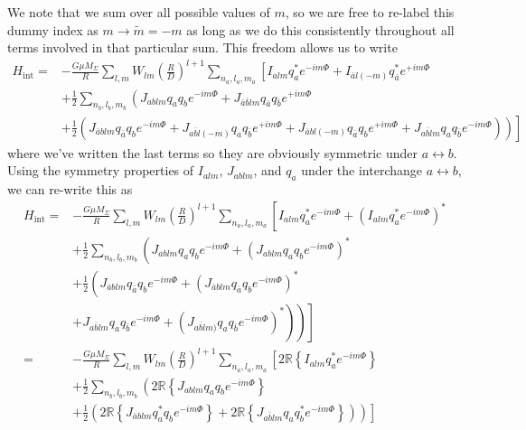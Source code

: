 We note that we sum over all possible values of $m$, so we are free to re-label this dummy index as $m\rightarrow\tilde{m}=-m$ as long as we do this consistently throughout all terms involved in that particular sum. This freedom allows us to write
\begin{subequations}
\begin{align}
H_{\mathrm{int}}  = & - \frac{G \mu M_{\Sigma}}{R} \sum_{l,m} W_{lm} \left(\frac{R}{D}\right)^{l+1} \sum_{n_a, l_a, m_a} \left[I_{alm}q_a^\ast e^{-i m \Phi} + I_{\bar{a}l(-m)}q_{\bar{a}}^\ast e^{+i m \Phi} \right. \\
                    & \left. + \frac{1}{2}\sum_{n_b,l_b,m_b} \left(J_{ablm}q_a q_b e^{-i m \Phi} + J_{\bar{a}\bar{b}lm}q_{\bar{a}}q_{\bar{b}} e^{+i m \Phi} \right. \right.\\
                    & \left. \left. + \frac{1}{2}\left( J_{\bar{a}blm}q_{\bar{a}} q_b e^{-i m \Phi} + J_{a\bar{b}l(-m)}q_a q_{\bar{b}} e^{+i m \Phi} + J_{\bar{a}bl(-m)}q_{\bar{a}} q_b e^{+i m \Phi} + J_{a\bar{b}lm}q_a q_{\bar{b}} e^{-i m \Phi} \right) \right) \right]
\end{align}
\end{subequations}
where we've written the last terms so they are obviously symmetric under $a \leftrightarrow b$. Using the symmetry properties of $I_{alm}$, $J_{ablm}$, and $q_{a}$ under the interchange $a\leftrightarrow b$, we can re-write this as
\begin{subequations}
\begin{align}
H_{\mathrm{int}}  = & - \frac{G \mu M_{\Sigma}}{R} \sum_{l,m} W_{lm} \left(\frac{R}{D}\right)^{l+1} \sum_{n_a, l_a, m_a} \left[I_{alm}q_a^\ast e^{-i m \Phi} + \left(I_{alm}q_{a}^\ast e^{-i m \Phi}\right)^\ast \right. \\
                    & \left. + \frac{1}{2}\sum_{n_b,l_b,m_b} \left(J_{ablm}q_a q_b e^{-i m \Phi} + \left(J_{ablm}q_{a}q_{b} e^{-i m \Phi}\right)^\ast \right. \right.\\
                    & \left. \left. + \frac{1}{2}\left( J_{\bar{a}blm}q_{\bar{a}} q_b e^{-i m \Phi} + \left(J_{\bar{a}blm}q_{\bar{a}} q_{b} e^{-i m \Phi}\right)^\ast \right. \right. \right. \\
                    & \left. \left. \left. + J_{a\bar{b}lm}q_{a} q_{\bar{b}} e^{-i m \Phi} + \left(J_{a\bar{b}lm)}q_{a} q_{\bar{b}} e^{-i m \Phi}\right)^\ast \right) \right) \right] \\
                  = & - \frac{G \mu M_{\Sigma}}{R} \sum_{l,m} W_{lm} \left(\frac{R}{D}\right)^{l+1} \sum_{n_a, l_a, m_a} \left[ 2\mathbb{R}\left\{I_{alm}q_a^\ast e^{-i m \Phi}\right\} \right. \\
                    & \left. + \frac{1}{2}\sum_{n_b,l_b,m_b} \left( 2\mathbb{R}\left\{J_{ablm}q_a q_b e^{-i m \Phi}\right\} \right. \right.\\
                    & \left. \left. + \frac{1}{2}\left( 2\mathbb{R}\left\{J_{\bar{a}blm}q_{a}^\ast q_b e^{-i m \Phi}\right\} + 2\mathbb{R}\left\{J_{a\bar{b}lm}q_{a} q_{b}^\ast e^{-i m \Phi}\right\} \right) \right) \right] 
\end{align}
\end{subequations}



